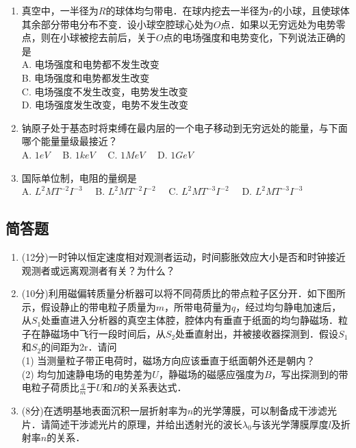 \begin{enumerate}
\item 真空中，一半径为$R$的球体均匀带电．在球内挖去一半径为$r$的小球，且使球体其余部分带电分布不变．设小球空腔球心处为$O$点．如果以无穷远处为电势零点，则在小球被挖去前后，关于$O$点的电场强度和电势变化，下列说法正确的是\\
A. 电场强度和电势都不发生改变 \\
B. 电场强度和电势都发生改变 \\
C. 电场强度不发生改变，电势发生改变 \\
D. 电场强度发生改变，电势不发生改变 \\
\item 钠原子处于基态时将束缚在最内层的一个电子移动到无穷远处的能量，与下面哪个能量量级最接近？\\
A. $1eV\quad$
B. $1keV\quad$
C. $1MeV\quad$
D. $1GeV\quad$
\item 国际单位制，电阻的量纲是\\
A. $L^{2}MT^{-2}I^{-3}\quad$
B. $L^{2}MT^{-2}I^{-2}\quad$
C. $L^{2}MT^{-3}I^{-2}\quad$
D. $L^{2}MT^{-3}I^{-3}\quad$
\end{enumerate}
\subsection{简答题}
\begin{enumerate}
\item (12分)一时钟以恒定速度相对观测者运动，时间膨胀效应大小是否和时钟接近观测者或远离观测者有关？为什么？
\item (10分)利用磁偏转质量分析器可以将不同荷质比的带点粒子区分开．如下图所示，假设静止的带电粒子质量为$m$，所带电荷量为$q$，经过均匀静电加速后，从$S_{1}$处垂直进入分析器的真空主体腔，腔体内有垂直于纸面的均匀静磁场．粒子在静磁场中飞行一段时间后，从$S_{2}$处垂直射出，并被接收器探测到．假设$S_{1}$和$S_{2}$的间距为2r．请问\\
(1) 当测量粒子带正电荷时，磁场方向应该垂直于纸面朝外还是朝内？\\
(2) 均匀加速静电场的电势差为$U$，静磁场的磁感应强度为$B$，写出探测到的带电粒子荷质比$\frac{q}{m}$于$U$和$B$的关系表达式．
\item (8分)在透明基地表面沉积一层折射率为$n$的光学薄膜，可以制备成干涉滤光片．请简述干涉滤光片的原理，并给出透射光的波长$\lambda_{0}$与该光学薄膜厚度$l$及折射率$n$的关系．
\end{enumerate}
